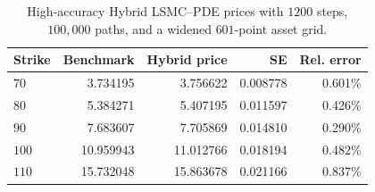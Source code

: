 \begin{table}[htbp]
\centering
\caption{High-accuracy Hybrid LSMC--PDE prices with \(1200\) steps, \(100{,}000\) paths, and a widened \(601\)-point asset grid.}
\label{tab:bgk_r05_v0114_vp009_t1_delta05_nex12-hybrid-highaccuracy}
\begin{tabular}{lrrrr}
\toprule
Strike & Benchmark & Hybrid price & SE & Rel. error \\
\midrule
$70$ & 3.734195 & 3.756622 & 0.008778 & 0.601\% \\
$80$ & 5.384271 & 5.407195 & 0.011597 & 0.426\% \\
$90$ & 7.683607 & 7.705869 & 0.014810 & 0.290\% \\
$100$ & 10.959943 & 11.012766 & 0.018194 & 0.482\% \\
$110$ & 15.732048 & 15.863678 & 0.021166 & 0.837\% \\
\bottomrule
\end{tabular}
\end{table}
